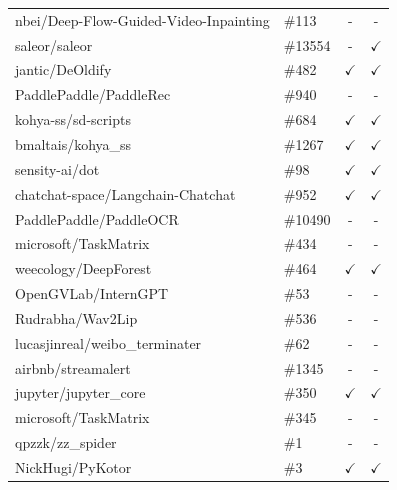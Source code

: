 \begin{table}[htbp]
\begin{tabular}{l l c c }
\cellcolor[HTML]{EFEFEF}nbei/Deep-Flow-Guided-Video-Inpainting & \cellcolor[HTML]{EFEFEF}\#113 & \cellcolor[HTML]{EFEFEF}- & \cellcolor[HTML]{EFEFEF}- \\
saleor/saleor & \#13554 & - & $\checkmark$ \\
\cellcolor[HTML]{EFEFEF}jantic/DeOldify & \cellcolor[HTML]{EFEFEF}\#482 & \cellcolor[HTML]{EFEFEF}$\checkmark$ & \cellcolor[HTML]{EFEFEF}$\checkmark$ \\
PaddlePaddle/PaddleRec & \#940 & - & - \\
\cellcolor[HTML]{EFEFEF}kohya-ss/sd-scripts & \cellcolor[HTML]{EFEFEF}\#684 & \cellcolor[HTML]{EFEFEF}$\checkmark$ & \cellcolor[HTML]{EFEFEF}$\checkmark$ \\
bmaltais/kohya\_ss & \#1267 & $\checkmark$ & $\checkmark$ \\
\cellcolor[HTML]{EFEFEF}sensity-ai/dot & \cellcolor[HTML]{EFEFEF}\#98 & \cellcolor[HTML]{EFEFEF}$\checkmark$ & \cellcolor[HTML]{EFEFEF}$\checkmark$ \\
chatchat-space/Langchain-Chatchat & \#952 & $\checkmark$ & $\checkmark$ \\
\cellcolor[HTML]{EFEFEF}PaddlePaddle/PaddleOCR & \cellcolor[HTML]{EFEFEF}\#10490 & \cellcolor[HTML]{EFEFEF}- & \cellcolor[HTML]{EFEFEF}- \\
microsoft/TaskMatrix & \#434 & - & - \\
\cellcolor[HTML]{EFEFEF}weecology/DeepForest & \cellcolor[HTML]{EFEFEF}\#464 & \cellcolor[HTML]{EFEFEF}$\checkmark$ & \cellcolor[HTML]{EFEFEF}$\checkmark$ \\
OpenGVLab/InternGPT & \#53 & - & - \\
\cellcolor[HTML]{EFEFEF}Rudrabha/Wav2Lip & \cellcolor[HTML]{EFEFEF}\#536 & \cellcolor[HTML]{EFEFEF}- & \cellcolor[HTML]{EFEFEF}- \\
lucasjinreal/weibo\_terminater & \#62 & - & - \\
\cellcolor[HTML]{EFEFEF}airbnb/streamalert & \cellcolor[HTML]{EFEFEF}\#1345 & \cellcolor[HTML]{EFEFEF}- & \cellcolor[HTML]{EFEFEF}- \\
jupyter/jupyter\_core & \#350 & $\checkmark$ & $\checkmark$ \\
\cellcolor[HTML]{EFEFEF}microsoft/TaskMatrix & \cellcolor[HTML]{EFEFEF}\#345 & \cellcolor[HTML]{EFEFEF}- & \cellcolor[HTML]{EFEFEF}- \\
qpzzk/zz\_spider & \#1 & - & - \\
\cellcolor[HTML]{EFEFEF}NickHugi/PyKotor & \cellcolor[HTML]{EFEFEF}\#3 & \cellcolor[HTML]{EFEFEF}$\checkmark$ & \cellcolor[HTML]{EFEFEF}$\checkmark$ \\ \hline
\end{tabular}
\end{table}

